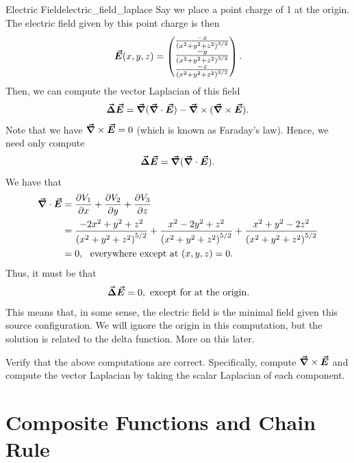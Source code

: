                \begin{ex}{Electric Field}{electric_field_laplace}
               Say we place a point charge of 1 at the origin.  The electric field given by this point charge is then
               \[
               \boldsymbol{\vec{E}}(x,y,z) = \begin{pmatrix} \frac{-x}{\left(x^2+y^2+z^2\right)^{3/2}} \\ \frac{-y}{\left(x^2+y^2+z^2\right)^{3/2}} \\ \frac{-z}{\left(x^2+y^2+z^2\right)^{3/2}} \end{pmatrix}.
               \]
               Then, we can compute the vector Laplacian of this field
               \[
               \boldsymbol{\vec{\Delta}} \boldsymbol{\vec{E}} = \boldsymbol{\vec{\nabla}}(\boldsymbol{\vec{\nabla}} \cdot \boldsymbol{\vec{E}}) - \boldsymbol{\vec{\nabla}} \times (\boldsymbol{\vec{\nabla}} \times \boldsymbol{\vec{E}}).
               \]
               Note that we have $\boldsymbol{\vec{\nabla}} \times \boldsymbol{\vec{E}} = 0$ (which is known as Faraday's law). Hence, we need only compute
               \[
               \boldsymbol{\vec{\Delta}} \boldsymbol{\vec{E}} = \boldsymbol{\vec{\nabla}}(\boldsymbol{\vec{\nabla}}\cdot \boldsymbol{\vec{E}}).
               \]
               We have that
               \begin{align*}
               \boldsymbol{\vec{\nabla}} \cdot \boldsymbol{\vec{E}} &= \frac{\partial V_1}{\partial x} +  \frac{\partial V_2}{\partial y} +  \frac{\partial V_3}{\partial z}\\
               &= \frac{-2x^2+y^2+z^2}{\left(x^2+y^2+z^2\right)^{5/2}} + \frac{x^2-2y^2+z^2}{\left(x^2+y^2+z^2\right)^{5/2}}+\frac{x^2+y^2-2z^2}{\left(x^2+y^2+z^2\right)^{5/2}}\\
               &= 0, \textrm{~ everywhere except at $(x,y,z)=0$}.
               \end{align*}
               Thus, it must be that
               \[
               \boldsymbol{\vec{\Delta}} \boldsymbol{\vec{E}} = 0, \textrm{~except for at the origin.}
               \]
                 This means that, in some sense, the electric field is the minimal field given this source configuration.  We will ignore the origin in this computation, but the solution is related to the delta function.  More on this later.
               \end{ex}

               \begin{exercise}
               Verify that the above computations are correct. Specifically, compute $\boldsymbol{\vec{\nabla}} \times \boldsymbol{\vec{E}}$ and compute the vector Laplacian by taking the scalar Laplacian of each component.
               \end{exercise}


       \section{Composite Functions and Chain Rule}

